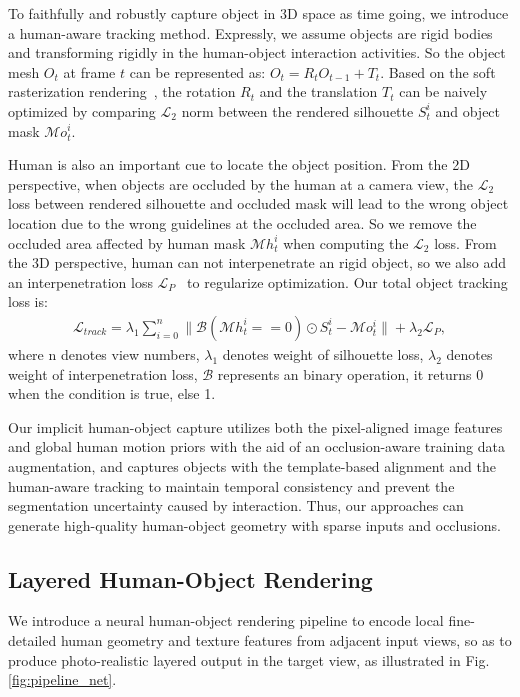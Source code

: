 To faithfully and robustly capture object in 3D space as time going, we introduce a human-aware tracking method.
%
Expressly, we assume objects are rigid bodies and transforming rigidly in the human-object interaction activities.
%
So the object mesh $O_{t}$ at frame $t$ can be represented as: $O_{t} = R_{t}O_{t-1}+T_{t}$.
% 
Based on the soft rasterization rendering~\cite{ravi2020accelerating}, the rotation $R_{t}$ and the translation $T_{t}$ can be naively optimized by comparing $\mathcal{L}_{2}$ norm between the rendered silhouette $S_{t}^{i}$ and object mask $\mathcal{M}o_{t}^{i}$.
%

Human is also an important cue to locate the object position.
%
From the 2D perspective, when objects are occluded by the human at a camera view, the  $\mathcal{L}_{2}$ loss between rendered silhouette and occluded mask will lead to the wrong object location due to the wrong guidelines at the occluded area.
%
So we remove the occluded area affected by human mask $\mathcal{M}h_{t}^{i}$ when computing the $\mathcal{L}_{2}$ loss.
%
From the 3D perspective, human can not interpenetrate an rigid object, so we also add an interpenetration loss $\mathcal{L}_{P}$~\cite{jiang2020mpshape} to regularize optimization. Our total object tracking loss is:
\begin{align}
	\mathcal{L}_{track} = \lambda_{1}\sum_{i=0}^{n}\| \mathcal{B}(\mathcal{M}h_{t}^{i}==0) \odot  S_{t}^{i} - \mathcal{M}o_{t}^{i}  \|  + \lambda_{2}\mathcal{L}_{P},
\end{align}
where n denotes view numbers, $\lambda_{1}$ denotes weight of silhouette loss, $\lambda_{2}$ denotes weight of interpenetration loss, $\mathcal{B}$ represents an binary operation, it returns 0 when the condition is true, else 1.

Our implicit human-object capture utilizes both the pixel-aligned image features and global human motion priors with the aid of an occlusion-aware training data augmentation, and captures objects with the template-based alignment and the human-aware tracking to maintain temporal consistency and prevent the segmentation uncertainty caused by interaction. Thus, our approaches can generate high-quality human-object geometry with sparse inputs and occlusions.

\subsection{Layered Human-Object Rendering}\label{sec:rendering}
We introduce a neural human-object rendering pipeline to encode local fine-detailed human geometry and texture features from adjacent input views, so as to produce photo-realistic layered output in the target view, as illustrated in Fig. \ref{fig:pipeline_net}.


